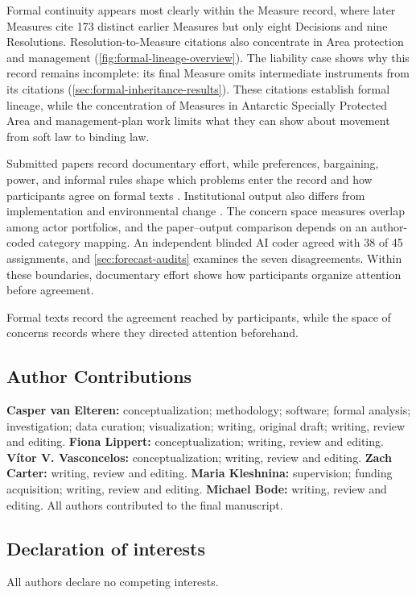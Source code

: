 \documentclass{fun_article}
\begin{document}
Formal continuity appears most clearly within the Measure record, where later Measures cite 173 distinct earlier Measures but only eight Decisions and nine Resolutions. Resolution-to-Measure citations also concentrate in Area protection and management (\cref{fig:formal-lineage-overview}). The liability case shows why this record remains incomplete: its final Measure omits intermediate instruments from its citations (\cref{sec:formal-inheritance-results}). These citations establish formal lineage, while the concentration of Measures in Antarctic Specially Protected Area and management-plan work limits what they can show about movement from soft law to binding law.

Submitted papers record documentary effort, while preferences, bargaining, power, and informal rules shape which problems enter the record and how participants agree on formal texts \cite{BachrachBaratz1962,Stone2013,Drubel2023HiddenContestation}. Institutional output also differs from implementation and environmental change \cite{GutnerThompson2010,CoenEtAl2022}. The concern space measures overlap among actor portfolios, and the paper--output comparison depends on an author-coded category mapping. An independent blinded AI coder agreed with 38 of 45 assignments, and \cref{sec:forecast-audits} examines the seven disagreements. Within these boundaries, documentary effort shows how participants organize attention before agreement.

Formal texts record the agreement reached by participants, while the space of concerns records where they directed attention beforehand.

\subsection*{Author Contributions}
\textbf{Casper van Elteren:} conceptualization; methodology; software; formal analysis; investigation; data curation; visualization; writing, original draft; writing, review and editing. \textbf{Fiona Lippert:} conceptualization; writing, review and editing. \textbf{Vítor V. Vasconcelos:} conceptualization; writing, review and editing. \textbf{Zach Carter:} writing, review and editing. \textbf{Maria Kleshnina:} supervision; funding acquisition; writing, review and editing. \textbf{Michael Bode:} writing, review and editing. All authors contributed to the final manuscript.

\subsection*{Declaration of interests}
All authors declare no competing interests.
\end{document}
